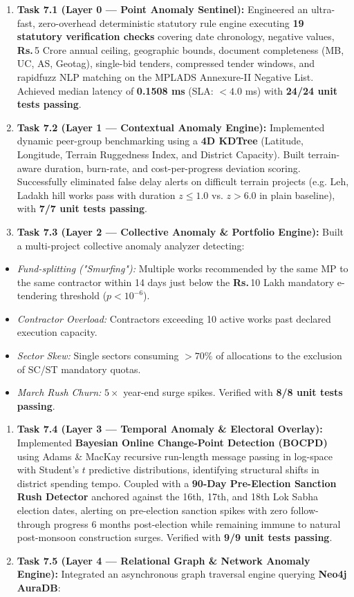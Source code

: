 \documentclass[11pt,a4paper]{article}
\DeclareRobustCommand{\INR}{\textbf{Rs.\,}}
\DeclareRobustCommand{\INR}{₹}
\begin{document}
\begin{enumerate}[leftmargin=1.5em, itemsep=2pt, topsep=3pt]
\item \textbf{Task 7.1 (Layer 0 --- Point Anomaly Sentinel):} Engineered an ultra-fast, zero-overhead deterministic statutory rule engine executing \textbf{19 statutory verification checks} covering date chronology, negative values, \INR{}5 Crore annual ceiling, geographic bounds, document completeness (MB, UC, AS, Geotag), single-bid tenders, compressed tender windows, and rapidfuzz NLP matching on the MPLADS Annexure-II Negative List. Achieved median latency of \textbf{0.1508 ms} (SLA: $< 4.0$ ms) with \textbf{24/24 unit tests passing}.
\item \textbf{Task 7.2 (Layer 1 --- Contextual Anomaly Engine):} Implemented dynamic peer-group benchmarking using a \textbf{4D KDTree} (Latitude, Longitude, Terrain Ruggedness Index, and District Capacity). Built terrain-aware duration, burn-rate, and cost-per-progress deviation scoring. Successfully eliminated false delay alerts on difficult terrain projects (e.g. Leh, Ladakh hill works pass with duration $z \le 1.0$ vs. $z > 6.0$ in plain baseline), with \textbf{7/7 unit tests passing}.
\item \textbf{Task 7.3 (Layer 2 --- Collective Anomaly \& Portfolio Engine):} Built a multi-project collective anomaly analyzer detecting:
\end{enumerate}
\begin{itemize}[leftmargin=1.5em, itemsep=2pt, topsep=3pt]
\item \textit{Fund-splitting ("Smurfing"):} Multiple works recommended by the same MP to the same contractor within 14 days just below the \INR{}10 Lakh mandatory e-tendering threshold ($p < 10^{-6}$).
\item \textit{Contractor Overload:} Contractors exceeding 10 active works past declared execution capacity.
\item \textit{Sector Skew:} Single sectors consuming $> 70\%$ of allocations to the exclusion of SC/ST mandatory quotas.
\item \textit{March Rush Churn:} $5\times$ year-end surge spikes. Verified with \textbf{8/8 unit tests passing}.
\end{itemize}
\begin{enumerate}[leftmargin=1.5em, itemsep=2pt, topsep=3pt]
\item \textbf{Task 7.4 (Layer 3 --- Temporal Anomaly \& Electoral Overlay):} Implemented \textbf{Bayesian Online Change-Point Detection (BOCPD)} using Adams \& MacKay recursive run-length message passing in log-space with Student's $t$ predictive distributions, identifying structural shifts in district spending tempo. Coupled with a \textbf{90-Day Pre-Election Sanction Rush Detector} anchored against the 16th, 17th, and 18th Lok Sabha election dates, alerting on pre-election sanction spikes with zero follow-through progress 6 months post-election while remaining immune to natural post-monsoon construction surges. Verified with \textbf{9/9 unit tests passing}.
\item \textbf{Task 7.5 (Layer 4 --- Relational Graph \& Network Anomaly Engine):} Integrated an asynchronous graph traversal engine querying \textbf{Neo4j AuraDB}:
\end{enumerate}
\end{document}
